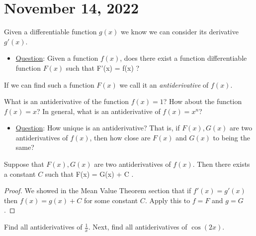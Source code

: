 \documentclass[11pt]{amsart}
\begin{document}
\newpage


\section*{November 14, 2022}

Given a differentiable function $g(x)$ we know we can consider its derivative $g'(x)$. 

\begin{itemize}
\item \ul{Question}: Given a function $f(x)$, does there exist a function differentiable function $F(x)$ such that 
\beqn
F'(x) = f(x) \quad ?
\eeqn
\end{itemize}

If we can find such a function $F(x)$ we call it an \textit{antiderivative} of $f(x)$. 

\begin{eg} 
What is an antiderivative of the function $f(x) = 1$? How about the function $f(x) = x$? 
In general, what is an antiderivative of $f(x) = x^n$?
\end{eg} 

\vspace{3cm} 

\begin{itemize}
\item \ul{Question}: How unique is an antiderivative? 
That is, if $F(x),G(x)$ are two antiderivatives of $f(x)$, then how close are $F(x)$ and $G(x)$ to being the same? 
\end{itemize}

\vspace{2cm}

\begin{thm} 
Suppose that $F(x),G(x)$ are two antiderivatives of $f(x)$. 
Then there exists a constant $C$ such that 
\beqn
F(x) = G(x) + C .
\eeqn
\end{thm}

\begin{proof}
We showed in the Mean Value Theorem section that if $f'(x) = g'(x)$ then $f (x)= g(x) + C$ for some constant $C$. 
Apply this to $f = F$ and $g=G$. 
\end{proof} 

\begin{eg} Find all antiderivatives of $\frac{1}{x}$. 
Next, find all antiderivatives of $\cos (2x)$. 
\end{eg} 

\vspace{2cm} 
\end{document}
